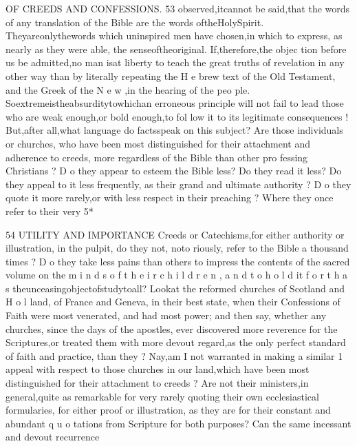 \documentclass[
]{book}
\begin{document}
OF CREEDS AND CONFESSIONS. 53
observed,itcannot be said,that the words of any translation of the Bible are the words
oftheHolySpirit. Theyareonlythewords which uninspired men have chosen,in which to express, as nearly as they were able, the
senseoftheoriginal. If,therefore,the objec tion before us be admitted,no man isat liberty
to teach the great truths of revelation in any other way than by literally repeating the H e brew text of the Old Testament, and the Greek of the N e w ,in the hearing of the peo ple. Soextremeistheabsurditytowhichan erroneous principle will not fail to lead those who are weak enough,or bold enough,to fol low it to its legitimate consequences !
But,after all,what language do factsspeak on this subject? Are those individuals or churches, who have been most distinguished for their attachment and adherence to creeds, more regardless of the Bible than other pro fessing Christians ? D o they appear to esteem the Bible less? Do they read it less? Do they appeal to it less frequently, as their grand and ultimate authority ? D o they quote it more rarely,or with less respect in their preaching ? Where they once refer to their
very
5*

54
UTILITY AND IMPORTANCE
Creeds or Catechisms,for either authority or
illustration, in the pulpit, do they not, noto riously, refer to the Bible a thousand times ?
D o they take less pains than others to impress the contents of the sacred volume on the
m i n d s o f t h e i r c h i l d r e n , a n d t o h o l d it f o r t h a s theunceasingobjectofstudytoall? Lookat the reformed churches of Scotland and H o l land, of France and Geneva, in their best state, when their Confessions of Faith were most venerated, and had most power; and then say, whether any churches, since the days of the apostles, ever discovered more reverence for the Scriptures,or treated them with more devout regard,as the only perfect
standard of faith and practice, than they ?
Nay,am I not warranted in making a similar 1 appeal with respect to those churches in our land,which have been most distinguished for
their attachment to creeds ? Are not their ministers,in general,quite as remarkable for very rarely quoting their own ecclesiastical formularies, for either proof or illustration, as they are for their constant and abundant q u o tations from Scripture for both purposes? Can the same incessant and devout recurrence
\end{document}
